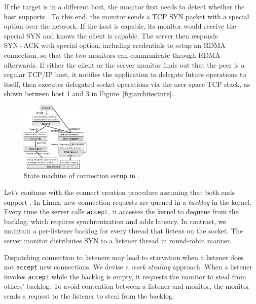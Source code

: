 If the target is in a different host, the monitor first needs to detect whether the host supports \sys{}.
To this end, the monitor sends a TCP SYN packet with a special option over the network.
If the host is \sys{} capable, its monitor would receive the special SYN and knows the client is \sys{} capable.
The server then responds SYN+ACK with special option, including credentials to setup an RDMA connection, so that the two monitors can communicate through RDMA afterwards.
If either the client or the server monitor finds out that the peer is a regular TCP/IP host, it notifies the application to delegate future operations to itself, 
then executes delegated socket operations via the user-space TCP stack, as shown between host 1 and 3 in Figure~\ref{fig:architecture}.


\begin{figure}[t!]
	\centering
	\includegraphics[width=0.3\textwidth]{images/conn-setup-new}
	\vspace{-5pt}
	\caption{State machine of connection setup in \libipc{}.}
	\label{fig:conn-setup}
\end{figure}

Let's continue with the connect creation procedure assuming that both ends support \sys{}.
In Linux, new connection requests are queued in a \emph{backlog} in the kernel.
Every time the server calls \texttt{accept}, it accesses the kernel to dequeue from the backlog, which requires synchronization and adds latency.
In contrast, we maintain a per-listener backlog for every thread that listens on the socket.
The server monitor distributes SYN to a listener thread in round-robin manner.

Dispatching connection to listeners may lead to starvation when a listener does not \texttt{accept} new connections.
We devise a \textit{work stealing} approach.
When a listener invokes \texttt{accept} while the backlog is empty, it requests the monitor to steal from others' backlog.
To avoid contention between a listener and monitor, the monitor sends a request to the listener to steal from the backlog.

